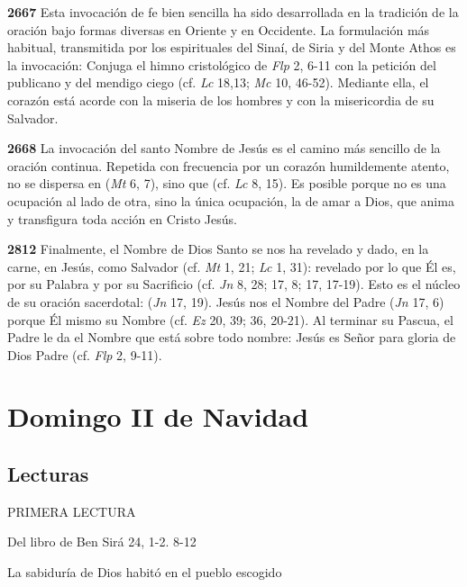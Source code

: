 \textbf{2667} Esta invocación de fe bien sencilla ha sido desarrollada en la tradición de la oración bajo formas diversas en Oriente y en Occidente. La formulación más habitual, transmitida por los espirituales del Sinaí, de Siria y del Monte Athos es la invocación:  Conjuga el himno cristológico de \emph{Flp} 2, 6-11 con la petición del publicano y del mendigo ciego (cf. \emph{Lc} 18,13; \emph{Mc} 10, 46-52). Mediante ella, el corazón está acorde con la miseria de los hombres y con la misericordia de su Salvador.

\textbf{2668} La invocación del santo Nombre de Jesús es el camino más sencillo de la oración continua. Repetida con frecuencia por un corazón humildemente atento, no se dispersa en  (\emph{Mt} 6, 7), sino que  (cf. \emph{Lc} 8, 15). Es posible  porque no es una ocupación al lado de otra, sino la única ocupación, la de amar a Dios, que anima y transfigura toda acción en Cristo Jesús.

\textbf{2812} Finalmente, el Nombre de Dios Santo se nos ha revelado y dado, en la carne, en Jesús, como Salvador (cf. \emph{Mt} 1, 21; \emph{Lc} 1, 31): revelado por lo que Él es, por su Palabra y por su Sacrificio (cf. \emph{Jn} 8, 28; 17, 8; 17, 17-19). Esto es el núcleo de su oración sacerdotal:  (\emph{Jn} 17, 19). Jesús nos  el Nombre del Padre (\emph{Jn} 17, 6) porque  Él mismo su Nombre (cf. \emph{Ez} 20, 39; 36, 20-21). Al terminar su Pascua, el Padre le da el Nombre que está sobre todo nombre: Jesús es Señor para gloria de Dios Padre (cf. \emph{Flp} 2, 9-11).

\chapter{Domingo II de Navidad}

\section{Lecturas}

PRIMERA LECTURA

Del libro de Ben Sirá 24, 1-2. 8-12

La sabiduría de Dios habitó en el pueblo escogido

